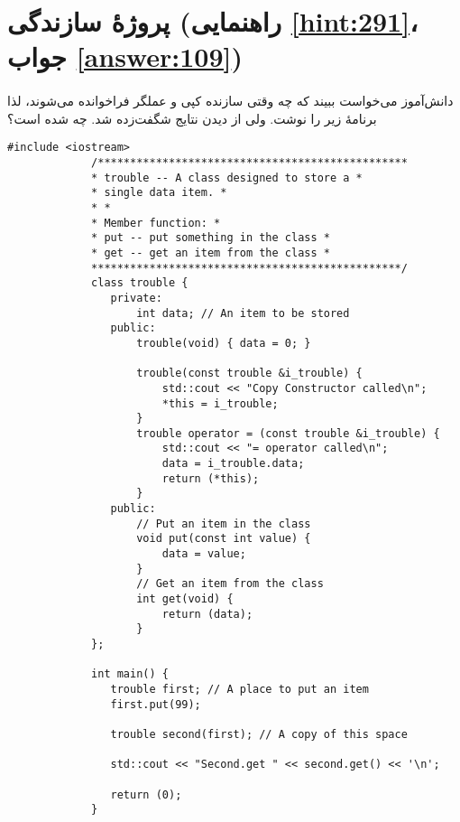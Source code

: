 \section[پروژهٔ سازندگی]{پروژهٔ سازندگی \protect{} (راهنمایی \ref{hint:291}، جواب \ref{answer:109})}
\paragraph{}\label{prog:84}
دانش‌آموز می‌خواست ببیند که چه وقتی سازنده کپی و عملگر \lr{\texttt{=}} فراخوانده می‌شوند، لذا برنامهٔ زیر را نوشت. ولی از دیدن نتایج شگفت‌زده شد. چه شده است؟

\begin{LTR}
        \begin{lstlisting}[style=C++Style]
             #include <iostream>
             /************************************************
             * trouble -- A class designed to store a *
             * single data item. *
             * *
             * Member function: *
             * put -- put something in the class *
             * get -- get an item from the class *
             ************************************************/
             class trouble {
             	private:
             		int data; // An item to be stored
             	public:
             		trouble(void) { data = 0; }

             		trouble(const trouble &i_trouble) {
             			std::cout << "Copy Constructor called\n";
             			*this = i_trouble;
             		}
             		trouble operator = (const trouble &i_trouble) {
             			std::cout << "= operator called\n";
             			data = i_trouble.data;
             			return (*this);
             		}
             	public:
             		// Put an item in the class
             		void put(const int value) {
             			data = value;
             		}
             		// Get an item from the class
             		int get(void) {
             			return (data);
             		}
             };

             int main() {
             	trouble first; // A place to put an item
             	first.put(99);

             	trouble second(first); // A copy of this space

             	std::cout << "Second.get " << second.get() << '\n';

             	return (0);
             }
        \end{lstlisting}
\end{LTR}